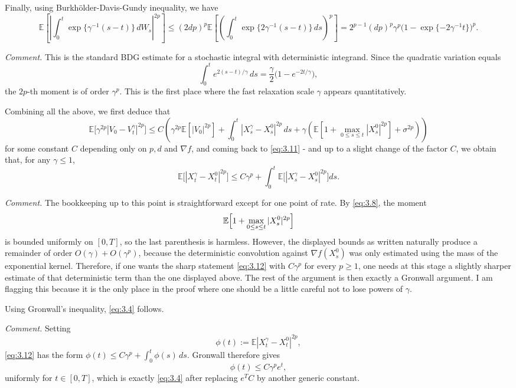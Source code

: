 \documentclass[11pt]{article}
\theoremstyle{remark}
\begin{document}
Finally, using Burkh\"older-Davis-Gundy inequality, we have
\[
\mathbb{E}\left[\left|\int_0^t \exp\{\gamma^{-1}(s-t)\}\,dW_s\right|^{2p}\right]
\le (2dp)^p\mathbb{E}\left[\left(\int_0^t \exp\{2\gamma^{-1}(s-t)\}\,ds\right)^p\right]
=2^{p-1}(dp)^p\gamma^p\bigl(1-\exp\{-2\gamma^{-1}t\}\bigr)^p.
\]

{\color{teal}
\noindent\emph{Comment.} This is the standard BDG estimate for a stochastic integral with deterministic integrand. Since the quadratic variation equals
\[
\int_0^t e^{2(s-t)/\gamma}\,ds=\frac{\gamma}{2}\bigl(1-e^{-2t/\gamma}\bigr),
\]
the $2p$-th moment is of order $\gamma^p$. This is the first place where the fast relaxation scale $\gamma$ appears quantitatively.
}

Combining all the above, we first deduce that
\[
\mathbb{E}\bigl[\gamma^{2p}|V_0-V_t^{\gamma}|^{2p}\bigr]\le C\left(\gamma^{2p}\mathbb{E}[|V_0|^{2p}]+\int_0^t |X_s^{\gamma}-X_s^0|^{2p}\,ds+\gamma\left(\mathbb{E}\left[1+\max_{0\le s\le t}|X_s^0|^{2p}\right]+\sigma^{2p}\right)\right)
\]
for some constant $C$ depending only on $p,d$ and $\nabla f$, and coming back to \eqref{eq:3.11} - and up to a slight change of the factor $C$, we obtain that, for any $\gamma\le 1$,
\begin{equation}
\label{eq:3.12}
\mathbb{E}\bigl[|X_t^{\gamma}-X_t^0|^{2p}\bigr]\le C\gamma^p+\int_0^t \mathbb{E}\bigl[|X_s^{\gamma}-X_s^0|^{2p}\bigr]ds.
\end{equation}

{\color{teal}
\noindent\emph{Comment.} The bookkeeping up to this point is straightforward except for one point of rate. By \eqref{eq:3.8}, the moment
\[
\mathbb{E}\Bigl[1+\max_{0\le s\le t}|X_s^0|^{2p}\Bigr]
\]
is bounded uniformly on $[0,T]$, so the last parenthesis is harmless. However, the displayed bounds as written naturally produce a remainder of order $O(\gamma)+O(\gamma^p)$, because the deterministic convolution against $\nabla f(X_s^0)$ was only estimated using the mass of the exponential kernel. Therefore, if one wants the sharp statement \eqref{eq:3.12} with $C\gamma^p$ for every $p\ge1$, one needs at this stage a slightly sharper estimate of that deterministic term than the one displayed above. The rest of the argument is then exactly a Gronwall argument. I am flagging this because it is the only place in the proof where one should be a little careful not to lose powers of $\gamma$.
}

Using Gronwall's inequality, \eqref{eq:3.4} follows.

{\color{teal}
\noindent\emph{Comment.} Setting
\[
\phi(t):=\mathbb{E}|X_t^\gamma-X_t^0|^{2p},
\]
\eqref{eq:3.12} has the form $\phi(t)\le C\gamma^p+\int_0^t \phi(s)\,ds$. Gronwall therefore gives
\[
\phi(t)\le C\gamma^p e^t,
\]
uniformly for $t\in[0,T]$, which is exactly \eqref{eq:3.4} after replacing $e^T C$ by another generic constant.
}
\end{document}
